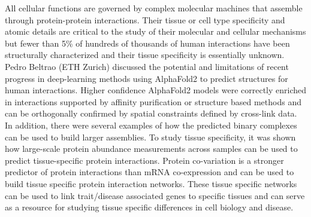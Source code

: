 All cellular functions are governed by complex molecular machines that assemble through protein-protein interactions. Their tissue or cell type specificity and atomic details are critical to the study of their molecular and cellular mechanisms but fewer than 5\% of hundreds of thousands of human interactions have been structurally characterized and their tissue specificity is essentially unknown. Pedro Beltrao (ETH Zurich) discussed the potential and limitations of recent progress in deep-learning methods using AlphaFold2 to predict structures for human interactions. Higher confidence AlphaFold2 models were correctly enriched in interactions supported by affinity purification or structure based methods and can be orthogonally confirmed by spatial constraints defined by cross-link data. In addition, there were several examples of how the predicted binary complexes can be used to build larger assemblies. To study tissue specificity, it was shown how large-scale protein abundance measurements across samples can be used to predict tissue-specific protein interactions. Protein co-variation is a stronger predictor of protein interactions than mRNA co-expression and can be used to build tissue specific protein interaction networks. These tissue specific networks can be used to link trait/disease associated genes to specific tissues and can serve as a resource for studying tissue specific differences in cell biology and disease.


